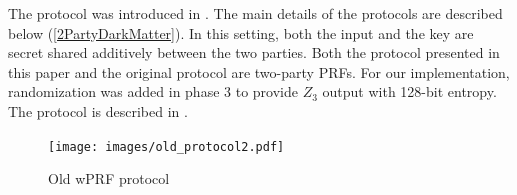 The protocol was introduced in \cite{darkmatter}. The main details of the protocols are described below (\ref{2PartyDarkMatter}). In this setting, both the input and the key are secret shared additively between the two parties. Both the protocol presented in this paper and the original protocol are two-party PRFs. For our implementation, randomization was added in phase 3 to provide $Z_3$ output with 128-bit entropy. 
The protocol is described in .

\begin{figure}[ht]
	\centering
	\texttt{[image: images/old\_protocol2.pdf]}
	\vspace{-2mm}
	\caption{Old wPRF protocol}
	\label{old_protocol.fig}
	\vspace{-5mm}
\end{figure}



